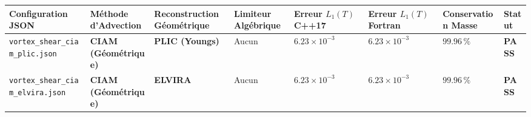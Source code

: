 \documentclass[
  10pt,
]{article}
\newcounter{none} %
\begin{document}
{\def\LTcaptype{none} %
\begin{longtable}[]{@{}
  >{\raggedright\arraybackslash}p{}
  >{\raggedright\arraybackslash}p{}
  >{\raggedright\arraybackslash}p{}
  >{\raggedright\arraybackslash}p{}
  >{\centering\arraybackslash}p{}
  >{\centering\arraybackslash}p{}
  >{\centering\arraybackslash}p{}
  >{\centering\arraybackslash}p{}@{}}
\toprule\noalign{}
\begin{minipage}[b]{\linewidth}\raggedright
Configuration JSON
\end{minipage} & \begin{minipage}[b]{\linewidth}\raggedright
Méthode d'Advection
\end{minipage} & \begin{minipage}[b]{\linewidth}\raggedright
Reconstruction Géométrique
\end{minipage} & \begin{minipage}[b]{\linewidth}\raggedright
Limiteur Algébrique
\end{minipage} & \begin{minipage}[b]{\linewidth}\centering
Erreur \(L_1(T)\) C++17
\end{minipage} & \begin{minipage}[b]{\linewidth}\centering
Erreur \(L_1(T)\) Fortran
\end{minipage} & \begin{minipage}[b]{\linewidth}\centering
Conservation Masse
\end{minipage} & \begin{minipage}[b]{\linewidth}\centering
Statut
\end{minipage} \\
\midrule\noalign{}
\endhead
\bottomrule\noalign{}
\endlastfoot
\texttt{vortex\_shear\_ciam\_plic.json} & \textbf{CIAM (Géométrique)} &
\textbf{PLIC (Youngs)} & Aucun & \textbf{\(6.23 \times 10^{-3}\)} &
\textbf{\(6.23 \times 10^{-3}\)} & \(99.96\,\%\) & \textbf{PASS} \\
\texttt{vortex\_shear\_ciam\_elvira.json} & \textbf{CIAM (Géométrique)}
& \textbf{ELVIRA} & Aucun & \textbf{\(6.23 \times 10^{-3}\)} &
\textbf{\(6.23 \times 10^{-3}\)} & \(99.96\,\%\) & \textbf{PASS} \\

\end{longtable}}
\end{document}
